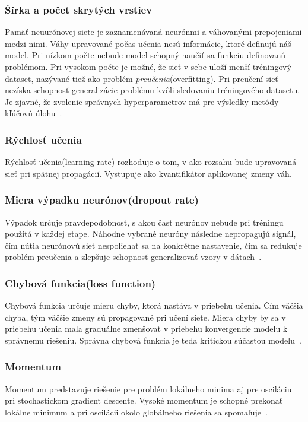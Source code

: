 \subsubsection*{Šírka a počet skrytých vrstiev} Pamäť neuurónovej siete je zaznamenávaná neurónmi a váhovanými prepojeniami medzi nimi. Váhy upravované počas učenia nesú informácie, ktoré definujú náš model. Pri nízkom počte nebude model schopný naučiť sa funkciu definovanú problémom. Pri vysokom počte je možné, že sieť v sebe uloží menší tréningový dataset, nazývané tiež ako problém \textit{preučenia}(overfitting). Pri preučení sieť nezíska schopnosť generalizácie problému kvôli sledovaniu tréningového datasetu. Je zjavné, že zvolenie správnych hyperparametrov má pre výsledky metódy kľúčovú úlohu~\cite{Goodfellow-et-al-2016-Book}.

\subsubsection*{Rýchlosť učenia} 
Rýchlosť učenia(learning rate) rozhoduje o tom, v ako rozsahu bude upravovaná sieť pri spätnej propagácií. Vystupuje ako kvantifikátor aplikovanej zmeny váh.

\subsubsection*{Miera výpadku neurónov(dropout rate)} 
Výpadok určuje pravdepodobnosť, s akou časť neurónov nebude pri tréningu použitá v každej etape. Náhodne vybrané neuróny následne nepropagujú signál, čím nútia neurónovú sieť nespoliehať sa na konkrétne nastavenie, čím sa redukuje problém preučenia a zlepšuje schopnosť generalizovať vzory v dátach~\cite{srivastava2014dropout}.
\subsubsection*{Chybová funkcia(loss function)} 
Chybová funkcia určuje mieru chyby, ktorá nastáva v priebehu učenia. Čím väčšia chyba, tým väčšie zmeny sú propagované pri učení siete. Miera chyby by sa v priebehu učenia mala graduálne zmenšovať v priebehu konvergencie modelu k správnemu riešeniu. Správna chybová funkcia je teda kritickou súčasťou modelu~\cite{christoffersen2004importance}.

\subsubsection*{Momentum} 
Momentum predstavuje riešenie pre problém lokálneho minima aj pre osciláciu pri stochastickom gradient descente. Vysoké momentum je schopné prekonať lokálne minimum a pri oscilácii okolo globálneho riešenia sa spomaľuje~\cite{attoh1999analysis}.

